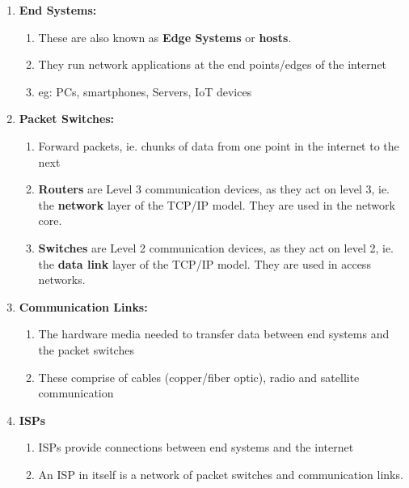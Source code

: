 \documentclass{article}
\theoremstyle{plain}
\theoremstyle{definition}
\begin{document}
\begin{enumerate}
    \item \textbf{End Systems:}
        \begin{enumerate}
            \item These are also known as \textbf{Edge Systems} or \textbf{hosts}.
            
            \item They run network applications at the end points/edges of the internet 
            
            \item eg: PCs, smartphones, Servers, IoT devices
        \end{enumerate}
        
    \item \textbf{Packet Switches:}
        \begin{enumerate}
            \item Forward packets, ie. chunks of data from one point in the internet to the next
            
            \item \textbf{Routers} are Level 3 communication devices, as they act on level 3, ie. the \textbf{network} layer of the TCP/IP model. They are used in the network core.
            
            \item \textbf{Switches} are Level 2 communication devices, as they act on level 2, ie. the \textbf{data link} layer of the TCP/IP model. They are used in access networks.
        \end{enumerate}
    
    \item \textbf{Communication Links:}
        \begin{enumerate}
            \item The hardware media needed to transfer data between end systems and the packet switches
            
            \item These comprise of cables (copper/fiber optic), radio and satellite communication
        \end{enumerate}
    
    \item \textbf{ISPs}
    \begin{enumerate}
        \item ISPs provide connections between end systems and the internet
        
        \item An ISP in itself is a network of packet switches and communication links.
    \end{enumerate}
    

\end{enumerate}
\end{document}
